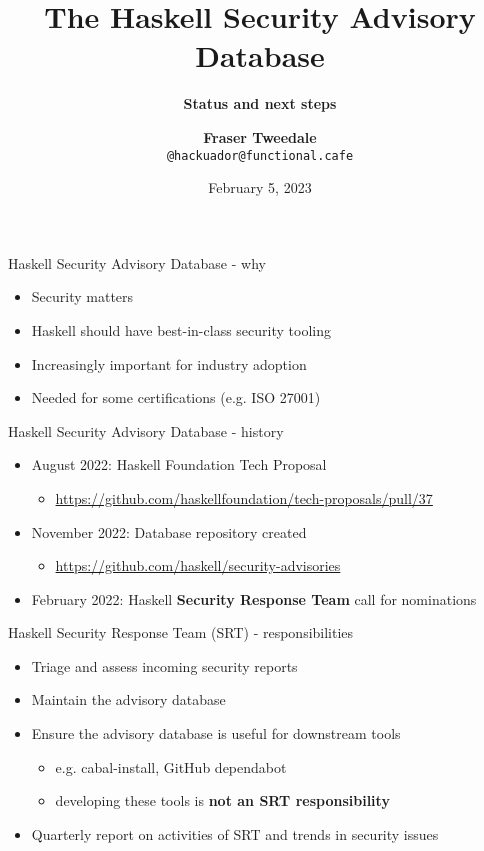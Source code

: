 \documentclass[ignorenonframetext,aspectratio=169,12pt]{beamer}
\title{\bf The Haskell Security Advisory Database}
\subtitle{\bf Status and next steps}
\author{{\bf Fraser Tweedale}\\
    \texttt{@hackuador@functional.cafe}}
\date{February 5, 2023}
\begin{document}
\frame{\titlepage}

\begin{frame}{Haskell Security Advisory Database - why}

\begin{itemize}
    \item Security matters
    \item Haskell should have best-in-class security tooling
    \item Increasingly important for industry adoption
    \item Needed for some certifications (e.g. ISO 27001)
\end{itemize}

\end{frame}

\begin{frame}{Haskell Security Advisory Database - history}

\begin{itemize}
    \item August 2022: Haskell Foundation Tech Proposal
        \begin{itemize}
            \item \url{https://github.com/haskellfoundation/tech-proposals/pull/37}
        \end{itemize}
    \item November 2022: Database repository created
        \begin{itemize}
            \item \url{https://github.com/haskell/security-advisories}
        \end{itemize}
    \item February 2022: Haskell {\bf Security Response Team} call
        for nominations
\end{itemize}

\end{frame}

\begin{frame}{Haskell Security Response Team (SRT) - responsibilities}

\begin{itemize}
    \item Triage and assess incoming security reports
    \item Maintain the advisory database
    \item Ensure the advisory database is useful for downstream tools
        \begin{itemize}
            \item e.g. cabal-install, GitHub dependabot
            \item developing these tools is {\bf not an SRT
                responsibility}
        \end{itemize}
    \item Quarterly report on activities of SRT and trends in
        security issues
\end{itemize}

\end{frame}
\end{document}
